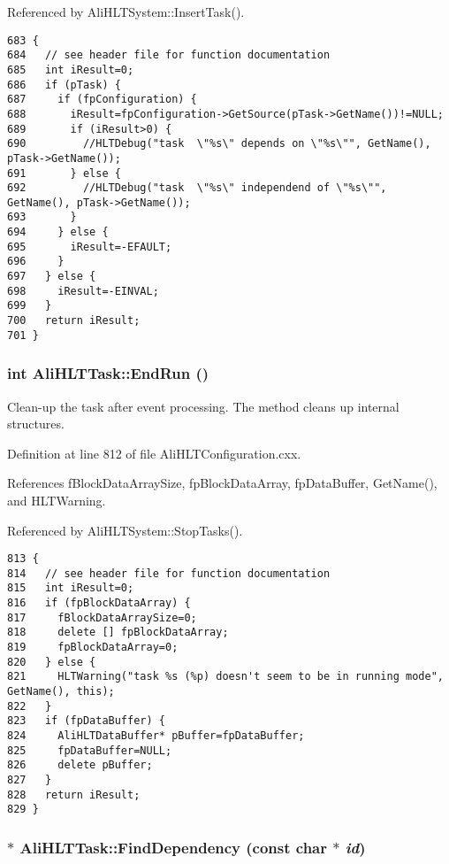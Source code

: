 Referenced by Ali\-HLTSystem::Insert\-Task().

\footnotesize\begin{verbatim}683 {
684   // see header file for function documentation
685   int iResult=0;
686   if (pTask) {
687     if (fpConfiguration) {
688       iResult=fpConfiguration->GetSource(pTask->GetName())!=NULL;
689       if (iResult>0) {
690         //HLTDebug("task  \"%s\" depends on \"%s\"", GetName(), pTask->GetName());
691       } else {
692         //HLTDebug("task  \"%s\" independend of \"%s\"", GetName(), pTask->GetName());
693       }
694     } else {
695       iResult=-EFAULT;
696     }
697   } else {
698     iResult=-EINVAL;
699   }
700   return iResult;
701 }
\end{verbatim}\normalsize 


\subsubsection{\setlength{\rightskip}{0pt plus 5cm}int Ali\-HLTTask::End\-Run ()}\label{classAliHLTTask_a19}


Clean-up the task after event processing. The method cleans up internal structures. 

Definition at line 812 of file Ali\-HLTConfiguration.cxx.

References f\-Block\-Data\-Array\-Size, fp\-Block\-Data\-Array, fp\-Data\-Buffer, Get\-Name(), and HLTWarning.

Referenced by Ali\-HLTSystem::Stop\-Tasks().

\footnotesize\begin{verbatim}813 {
814   // see header file for function documentation
815   int iResult=0;
816   if (fpBlockDataArray) {
817     fBlockDataArraySize=0;
818     delete [] fpBlockDataArray;
819     fpBlockDataArray=0;
820   } else {
821     HLTWarning("task %s (%p) doesn't seem to be in running mode", GetName(), this);
822   }
823   if (fpDataBuffer) {
824     AliHLTDataBuffer* pBuffer=fpDataBuffer;
825     fpDataBuffer=NULL;
826     delete pBuffer;
827   }
828   return iResult;
829 }
\end{verbatim}\normalsize 


\subsubsection{ $\ast$ Ali\-HLTTask::Find\-Dependency (const char $\ast$ {\em id})}\label{classAliHLTTask_a10}


